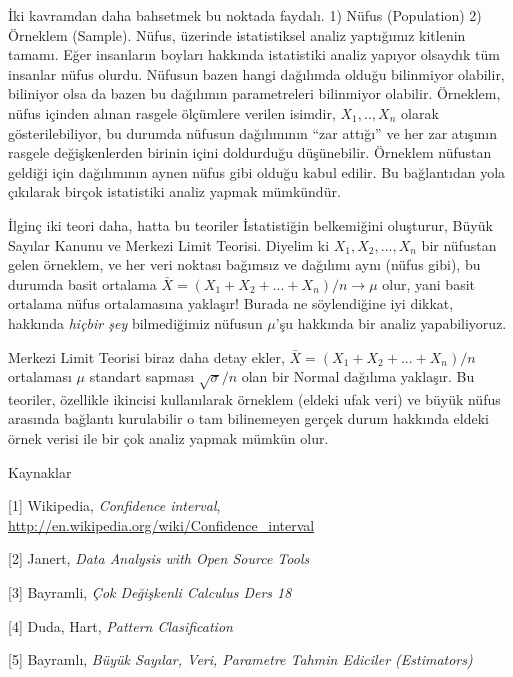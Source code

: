 \documentclass[12pt,fleqn]{article}\usepackage{../../common}
\begin{document}
İki kavramdan daha bahsetmek bu noktada faydalı. 1) Nüfus (Population) 2)
Örneklem (Sample). Nüfus, üzerinde istatistiksel analiz yaptığımız kitlenin
tamamı. Eğer insanların boyları hakkında istatistiki analiz yapıyor
olsaydık tüm insanlar nüfus olurdu. Nüfusun bazen hangi dağılımda olduğu
bilinmiyor olabilir, biliniyor olsa da bazen bu dağılımın parametreleri
bilinmiyor olabilir. Örneklem, nüfus içinden alınan rasgele ölçümlere
verilen isimdir, $X_1,..,X_n$ olarak gösterilebiliyor, bu durumda nüfusun
dağılımının ``zar attığı'' ve her zar atışının rasgele değişkenlerden
birinin içini doldurduğu düşünebilir. Örneklem nüfustan geldiği için
dağılımının aynen nüfus gibi olduğu kabul edilir. Bu bağlantıdan yola
çıkılarak birçok istatistiki analiz yapmak mümkündür.

İlginç iki teori daha, hatta bu teoriler İstatistiğin belkemiğini oluşturur,
Büyük Sayılar Kanunu ve Merkezi Limit Teorisi. Diyelim ki $X_1,X_2,...,X_n$ bir
nüfustan gelen örneklem, ve her veri noktası bağımsız ve dağılımı aynı (nüfus
gibi), bu durumda basit ortalama $\bar{X} = (X_1+X_2+...+X_n) / n \to \mu$ olur,
yani basit ortalama nüfus ortalamasına yaklaşır! Burada ne söylendiğine iyi
dikkat, hakkında {\em hiçbir şey} bilmediğimiz nüfusun $\mu$'şu hakkında
bir analiz yapabiliyoruz. 

Merkezi Limit Teorisi biraz daha detay ekler, $\bar{X} = (X_1+X_2+...+X_n)
/ n$ ortalaması $\mu$ standart sapması $\sqrt{\sigma} / n$ olan bir Normal
dağılıma yaklaşır. Bu teoriler, özellikle ikincisi kullanılarak örneklem
(eldeki ufak veri) ve büyük nüfus arasında bağlantı kurulabilir o tam
bilinemeyen gerçek durum hakkında eldeki örnek verisi ile bir çok analiz
yapmak mümkün olur.

Kaynaklar

[1] Wikipedia, {\em Confidence interval}, \url{http://en.wikipedia.org/wiki/Confidence_interval}

[2] Janert, {\em Data Analysis with Open Source Tools}

[3] Bayramli, {\em Çok Değişkenli Calculus Ders 18}

[4] Duda, Hart, {\em Pattern Clasification}

[5] Bayramlı, {\em Büyük Sayılar, Veri, Parametre Tahmin Ediciler (Estimators)}
\end{document}

